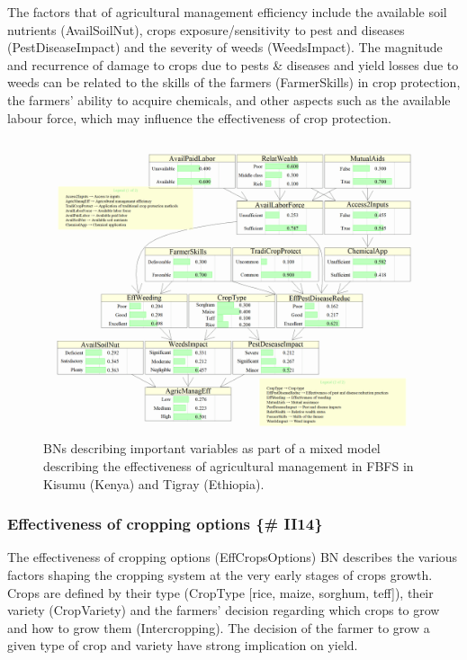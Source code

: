 \documentclass[12pt,oneside]{article}
\begin{document}
The factors that of agricultural management efficiency include the available soil nutrients (AvailSoilNut), crops exposure/sensitivity to pest and diseases (PestDiseaseImpact) and the severity of weeds (WeedsImpact). The magnitude and recurrence of damage to crops due to pests \& diseases and yield losses due to weeds can be related to the skills of the farmers (FarmerSkills) in crop protection, the farmers' ability to acquire chemicals, and other aspects such as the available labour force, which may influence the effectiveness of crop protection.

\begin{figure}[!htbp]

{\centering \includegraphics[width=1\linewidth,]{figures/Modelling_FBFS_Agricultural_management_efficiency_BNs_plot} 

}

\caption{BNs describing important variables as part of a mixed model describing the effectiveness of agricultural management in FBFS in Kisumu (Kenya) and Tigray (Ethiopia).}\label{fig:fig5}
\end{figure}

\hypertarget{effectiveness-of-cropping-options-ii14}{%
\subsubsection{Effectiveness of cropping options \{\# II14\}}\label{effectiveness-of-cropping-options-ii14}}

The effectiveness of cropping options (EffCropsOptions) BN describes the various factors shaping the cropping system at the very early stages of crops growth. Crops are defined by their type (CropType {[}rice, maize, sorghum, teff{]}), their variety (CropVariety) and the farmers' decision regarding which crops to grow and how to grow them (Intercropping). The decision of the farmer to grow a given type of crop and variety have strong implication on yield.
\end{document}
